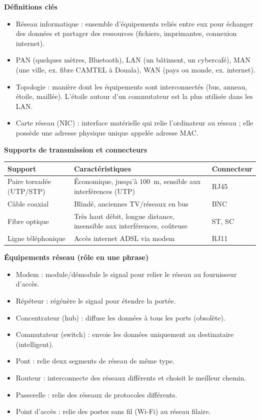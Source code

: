 \documentclass[11pt]{article}
\newcommand{\cle}[1]{{\popxbold\color{popdark}#1}}
\begin{document}
\begin{bilan}
\textbf{Définitions clés}
\begin{itemize}
  \item \cle{Réseau informatique} : ensemble d'équipements reliés entre eux pour échanger des données et partager des ressources (fichiers, imprimantes, connexion internet).
  \item \cle{PAN} (quelques mètres, Bluetooth), \cle{LAN} (un bâtiment, un cybercafé), \cle{MAN} (une ville, ex. fibre CAMTEL à Douala), \cle{WAN} (pays ou monde, ex. internet).
  \item \cle{Topologie} : manière dont les équipements sont interconnectés (bus, anneau, étoile, maillée). L'étoile autour d'un commutateur est la plus utilisée dans les LAN.
  \item \cle{Carte réseau (NIC)} : interface matérielle qui relie l'ordinateur au réseau ; elle possède une adresse physique unique appelée \cle{adresse MAC}.
\end{itemize}

\textbf{Supports de transmission et connecteurs}
\begin{center}
\begin{tabularx}{\linewidth}{|l|X|l|}
\hline
\rowcolor{popblueL} \textbf{Support} & \textbf{Caractéristiques} & \textbf{Connecteur} \\
\hline
Paire torsadée (UTP/STP) & Économique, jusqu'à \SI{100}{m}, sensible aux interférences (UTP) & RJ45 \\
\hline
Câble coaxial & Blindé, anciennes TV/réseaux en bus & BNC \\
\hline
Fibre optique & Très haut débit, longue distance, insensible aux interférences, coûteuse & ST, SC \\
\hline
Ligne téléphonique & Accès internet ADSL via modem & RJ11 \\
\hline
\end{tabularx}
\end{center}

\textbf{Équipements réseau (rôle en une phrase)}
\begin{itemize}
  \item \cle{Modem} : module/démodule le signal pour relier le réseau au fournisseur d'accès.
  \item \cle{Répéteur} : régénère le signal pour étendre la portée.
  \item \cle{Concentrateur (hub)} : diffuse les données à tous les ports (obsolète).
  \item \cle{Commutateur (switch)} : envoie les données uniquement au destinataire (intelligent).
  \item \cle{Pont} : relie deux segments de réseau de même type.
  \item \cle{Routeur} : interconnecte des réseaux différents et choisit le meilleur chemin.
  \item \cle{Passerelle} : relie des réseaux de protocoles différents.
  \item \cle{Point d'accès} : relie des postes sans fil (Wi-Fi) au réseau filaire.
\end{itemize}


\end{bilan}
\end{document}
